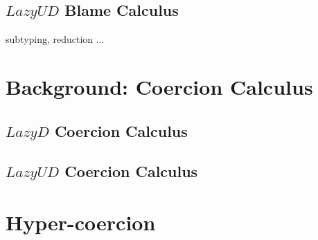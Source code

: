 \documentclass[acmsmall,review,anonymous]{acmart}\settopmatter{printfolios=true,printccs=false,printacmref=false}
\begin{document}
\subsection{$Lazy UD$ Blame Calculus}

subtyping, reduction ...

\section{Background: Coercion Calculus}

\subsection{$Lazy D$ Coercion Calculus}

\subsection{$Lazy UD$ Coercion Calculus}

\section{Hyper-coercion} \label{sec:hyper-coercion}
\end{document}
